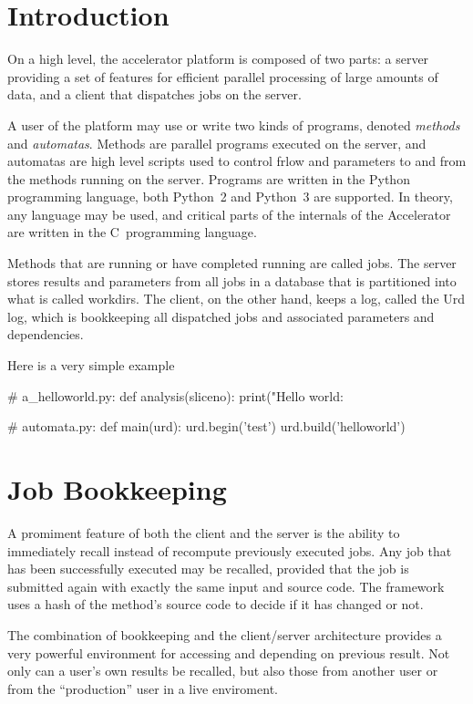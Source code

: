 
\section{Introduction}

On a high level, the accelerator platform is composed of two parts: a
server providing a set of features for efficient parallel processing
of large amounts of data, and a client that dispatches jobs on the
server.

A user of the platform may use or write two kinds of programs, denoted
\textsl{methods} and \textsl{automatas}.  Methods are parallel
programs executed on the server, and automatas are high level scripts
used to control frlow and parameters to and from the methods running
on the server.  Programs are written in the Python programming
language, both Python~2 and Python~3 are supported.  In theory, any
language may be used, and critical parts of the internals of the
Accelerator are written in the C~programming language.

Methods that are running or have completed running are called jobs.
The server stores results and parameters from all jobs in a database
that is partitioned into what is called workdirs.  The client, on the
other hand, keeps a log, called the Urd log, which is bookkeeping all
dispatched jobs and associated parameters and dependencies.

Here is a very simple example
\\
\begin{python}
# a_helloworld.py:
def analysis(sliceno):
  print("Hello world: %

# automata.py:
def main(urd):
  urd.begin('test')
  urd.build('helloworld')
\end{python}


\section{Job Bookkeeping}

A promiment feature of both the client and the server is the ability
to immediately recall instead of recompute previously executed jobs.
Any job that has been successfully executed may be recalled, provided
that the job is submitted again with exactly the same input and source
code.  The framework uses a hash of the method's source code to decide
if it has changed or not.

The combination of bookkeeping and the client/server architecture
provides a very powerful environment for accessing and depending on
previous result.  Not only can a user's own results be recalled, but
also those from another user or from the ``production'' user in a live
enviroment.


